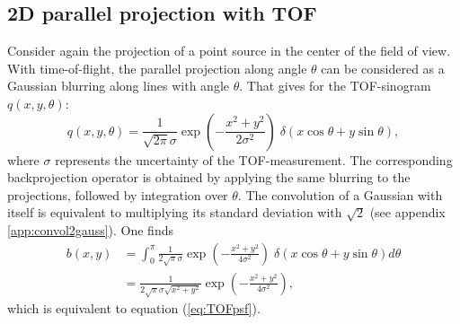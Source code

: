 \documentclass[11pt,oneside]{book}
\begin{document}
\subsection{2D parallel projection with TOF}
Consider again the projection of a point source in the center of the
field of view. With time-of-flight, the parallel projection along
angle $\theta$ can be considered as a Gaussian blurring along lines
with angle $\theta$. That gives for the TOF-sinogram $q(x,y,\theta)$:
\begin{equation}
 q(x,y,\theta) = \frac{1}{\sqrt{2\pi}\sigma}
               \exp(-\frac{x^2+y^2}{2 \sigma^2}) \;
              \delta(x\cos\theta + y\sin\theta),
\end{equation}
where $\sigma$ represents the uncertainty of the TOF-measurement. The
corresponding backprojection operator is obtained by applying the same
blurring to the projections, followed by integration over
$\theta$. The convolution of a Gaussian with itself is equivalent to
multiplying its standard deviation with $\sqrt{2}$ (see appendix
\ref{app:convol2gauss}). One finds
\begin{align}
  b(x,y) &= \int_0^\pi \frac{1}{2\sqrt{\pi}\sigma}
               \exp(-\frac{x^2+y^2}{4 \sigma^2}) \;
              \delta(x\cos\theta + y\sin\theta) d\theta\\
 &= \frac{1}{2\sqrt{\pi}\sigma \sqrt{x^2 + y^2}}
               \exp(-\frac{x^2+y^2}{4 \sigma^2}),
\end{align}
which is equivalent to equation (\ref{eq:TOFpsf}).
\end{document}
